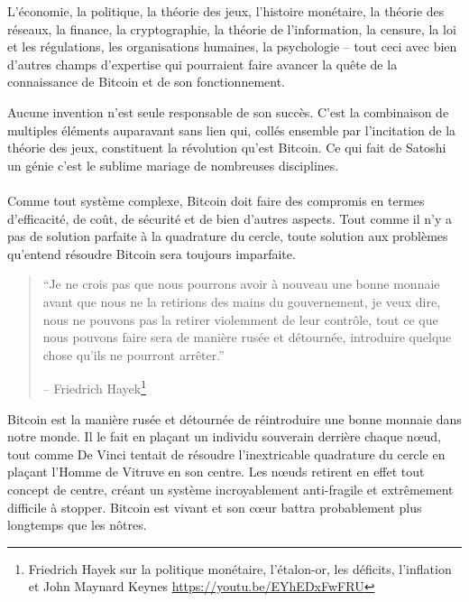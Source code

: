 L'économie, la politique, la théorie des jeux, l'histoire monétaire, la théorie
des réseaux, la finance, la cryptographie, la théorie de l'information, la
censure, la loi et les régulations, les organisations humaines, la psychologie
-- tout ceci avec bien d'autres champs d'expertise qui pourraient faire avancer
la quête de la connaissance de Bitcoin et de son fonctionnement.

Aucune invention n'est seule responsable de son succès. C'est la combinaison
de multiples éléments auparavant sans lien qui, collés ensemble par l'incitation
de la théorie des jeux, constituent la révolution qu'est Bitcoin. Ce qui fait de
Satoshi un génie c'est le sublime mariage de nombreuses disciplines. 

\paragraph{} Comme tout système complexe, Bitcoin doit faire des compromis en
termes d'efficacité, de coût, de sécurité et de bien d'autres aspects. Tout
comme il n'y a pas de solution parfaite à la quadrature du cercle, toute
solution aux problèmes qu'entend résoudre Bitcoin sera toujours imparfaite.

\begin{quotation}\begin{samepage}
\enquote{Je ne crois pas que nous pourrons avoir à nouveau une bonne monnaie
avant que nous ne la retirions des mains du gouvernement, je veux dire, nous ne
pouvons pas la retirer violemment de leur contrôle, tout ce que nous pouvons
faire sera de manière rusée et détournée, introduire quelque chose qu'ils ne
pourront arrêter.}
\begin{flushright} -- Friedrich Hayek\footnote{Friedrich Hayek sur la politique
monétaire, l'étalon-or, les déficits, l'inflation et John Maynard Keynes
\url{https://youtu.be/EYhEDxFwFRU}}
\end{flushright}\end{samepage}\end{quotation}

Bitcoin est la manière rusée et détournée de réintroduire une bonne monnaie dans
notre monde. Il le fait en plaçant un individu souverain derrière chaque nœud,
tout comme De Vinci tentait de résoudre l'inextricable quadrature du cercle en
plaçant l'Homme de Vitruve en son centre. Les nœuds retirent en effet tout
concept de centre, créant un système incroyablement anti-fragile et extrêmement
difficile à stopper. Bitcoin est vivant et son cœur battra probablement plus
longtemps que les nôtres.

